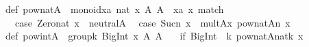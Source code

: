 \begin{isabellebody}
\begin{isamarkuptext}
{}\isanewline
\isanewline
def\ pow{}nat{}A\ {}\ monoid{}{}xa{}{}\ nat{}\ x{}\ A{}{}\ A\ {}\ {}xa{}{}\ x{}\ match\ {}\isanewline
\ \ case\ {}Zero{}nat{}\ x{}\ {}{}\ neutral{}A{}\isanewline
\ \ case\ {}Suc{}n{}{}\ x{}\ {}{}\ mult{}A{}{}x{}\ pow{}nat{}A{}{}n{}\ x{}{}\isanewline
{}\isanewline
\isanewline
def\ pow{}int{}A\ {}\ group{}{}k{}\ BigInt{}\ x{}\ A{}{}\ A\ {}\isanewline
\ \ {}if\ {}BigInt{}{}{}\ {}{}\ k{}\ pow{}nat{}A{}{}nat{}k{}{}\ x{}\isanewline

\end{isamarkuptext}
\end{isabellebody}
